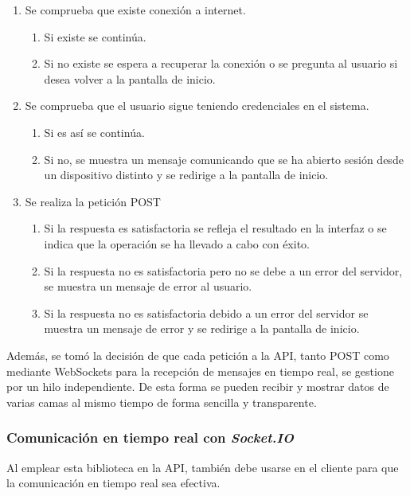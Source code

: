 \begin{minipage}{\linewidth}
\begin{enumerate}
	\item Se comprueba que existe conexión a internet.
	\begin{enumerate}
		\item Si existe se continúa. 
		\item Si no existe se espera a recuperar la conexión o se pregunta al usuario si desea volver a la pantalla de inicio. 
	\end{enumerate}
	\item Se comprueba que el usuario sigue teniendo credenciales en el sistema.
	\begin{enumerate}
		\item Si es así se continúa. 
		\item Si no, se muestra un mensaje comunicando que se ha abierto sesión desde un dispositivo distinto y se redirige a la pantalla de inicio. 
	\end{enumerate}
	\item Se realiza la petición POST
	\begin{enumerate}
		\item Si la respuesta es satisfactoria se refleja el resultado en la interfaz o se indica que la operación se ha llevado a cabo con éxito.  
		\item Si la respuesta no es satisfactoria pero no se debe a un error del servidor, se muestra un mensaje de error al usuario. 
		\item Si la respuesta no es satisfactoria debido a un error del servidor se muestra un mensaje de error y se redirige a la pantalla de inicio. 
	\end{enumerate}
\end{enumerate}
\end{minipage}

Además, se tomó la decisión de que cada petición a la API, tanto POST como mediante WebSockets para la recepción de mensajes en tiempo real, se gestione por un hilo independiente. De esta forma se pueden recibir y mostrar datos de varias camas al mismo tiempo de forma sencilla y transparente. 

\subsubsection{Comunicación en tiempo real con \textit{Socket.IO}}

Al emplear esta biblioteca en la API, también debe usarse en el cliente para que la comunicación en tiempo real sea efectiva. 

